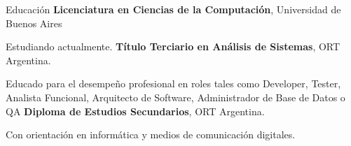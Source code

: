 \begin{rubric}{Educación}
\entry*[2022 -- act.]%
	\textbf{Licenciatura en Ciencias de la Computación}, Universidad de Buenos Aires\par
	Estudiando actualmente.
\entry*[2020 -- 2021]%
	\textbf{Título Terciario en Análisis de Sistemas}, ORT Argentina.\par
Educado para el desempeño profesional en roles tales como Developer, Tester, Analista Funcional, Arquitecto de Software, Administrador de Base de Datos o QA
\entry*[2013 -- 2018]%
	\textbf{Diploma de Estudios Secundarios}, ORT Argentina.
\par  Con orientación en informática y medios de comunicación digitales.
\end{rubric}